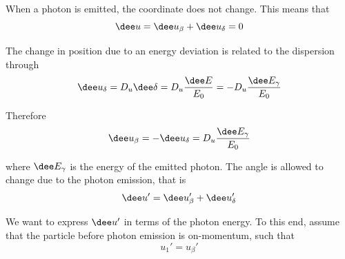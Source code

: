 When a photon is emitted, the coordinate does not change. This means that
\begin{equation}
    \dee u = \dee u_\beta + \dee u_\delta = 0
\end{equation}

The change in position due to an energy deviation is related to the dispersion through
\begin{equation}
    \dee u_\delta = D_u \dee \delta = D_u \frac{\dee E}{E_0} = - D_u \frac{\dee E_\gamma}{E_0}
\end{equation}

Therefore
\begin{equation}
    \dee u_\beta = - \dee u_\delta = D_u \frac{\dee E_\gamma}{E_0}
    \label{eq:deeubeta}
\end{equation}

where $\dee E_\gamma$ is the energy of the emitted photon. The angle is allowed to change due to the photon emission, that is
\begin{equation}
    \dee u' = \dee u_\beta' + \dee u_\delta'
\end{equation}

We want to express $\dee u'$ in terms of the photon energy. To this end, assume that the particle before photon emission is on-momentum, such that
\begin{equation}
    u_1' = u_\beta'
\end{equation}




